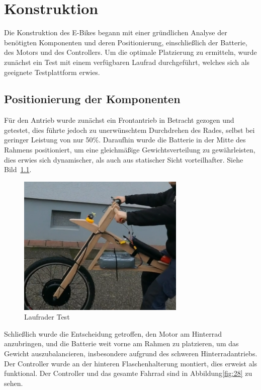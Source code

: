 \chapter{Konstruktion}

Die Konstruktion des E-Bikes begann mit einer gründlichen Analyse der benötigten Komponenten und deren Positionierung, einschließlich der Batterie, des Motors und des Controllers.
Um die optimale Platzierung zu ermitteln, wurde zunächst ein Test mit einem verfügbaren Laufrad durchgeführt, welches sich als geeignete Testplattform erwies.

\section{Positionierung der Komponenten}

Für den Antrieb wurde zunächst ein Frontantrieb in Betracht gezogen und getestet, dies führte jedoch zu unerwünschtem Durchdrehen des Rades, selbst bei geringer Leistung von nur 50\%.
Daraufhin wurde die Batterie in der Mitte des Rahmens positioniert, um eine gleichmäßige Gewichtsverteilung zu gewährleisten,
dies erwies sich dynamischer, als auch aus statischer Sicht vorteilhafter.
Siehe Bild~\ref{fig:27}.
\begin{figure}[h!]
    \centering
    \includegraphics[width=8cm]{images/Bild des Laufrads}
    \caption{Laufrader Test\cite{lorenz_scherrer_selbst_2023}}
    \label{fig:27}
\end{figure}


Schließlich wurde die Entscheidung getroffen, den Motor am Hinterrad anzubringen, und die Batterie weit vorne am Rahmen zu platzieren, um das Gewicht auszubalancieren, insbesondere aufgrund des schweren Hinterradantriebs. 
Der Controller wurde an der hinteren Flaschenhalterung montiert, dies erweist als funktional.
Der Controller und das gesamte Fahrrad sind in Abbildung\ref{fig:28} zu sehen.


